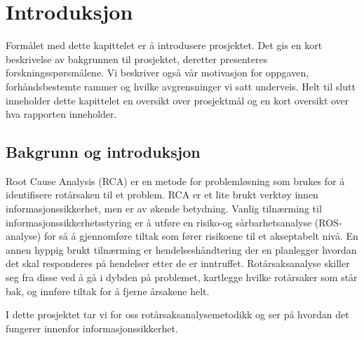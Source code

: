 \chapter{Introduksjon}
\label{kap:introduksjon}
Formålet med dette kapittelet er å introdusere prosjektet. Det gis en kort beskrivelse av bakgrunnen til prosjektet, deretter presenteres forskningsspørsmålene. Vi beskriver også vår motivasjon for oppgaven,  forhåndsbestemte rammer og hvilke avgrensninger vi satt underveis. Helt til slutt inneholder dette kapittelet en oversikt over prosjektmål og en kort oversikt over hva rapporten inneholder.


\section{Bakgrunn og introduksjon}
\label{sec:bakgrunn}
Root Cause Analysis (RCA) er en metode for problemløsning som brukes for å identifisere rotårsaken til et problem. RCA er et lite brukt verktøy innen informasjonssikkerhet, men er av økende betydning. Vanlig tilnærming til informasjonssikkerhetsstyring er å utføre en risiko-og sårbarhetsanalyse (ROS-analyse) for så å gjennomføre tiltak som fører risikoene til et akseptabelt nivå. En annen hyppig brukt tilnærming er hendelseshåndtering der en planlegger hvordan det skal responderes på hendelser etter de er inntruffet. Rotårsaksanalyse skiller seg fra disse ved å gå i dybden på problemet, kartlegge hvilke rotårsaker som står bak, og innføre tiltak for å fjerne årsakene helt. 

I dette prosjektet tar vi for oss rotårsaksanalysemetodikk og ser på hvordan det fungerer innenfor informasjonssikkerhet. 
